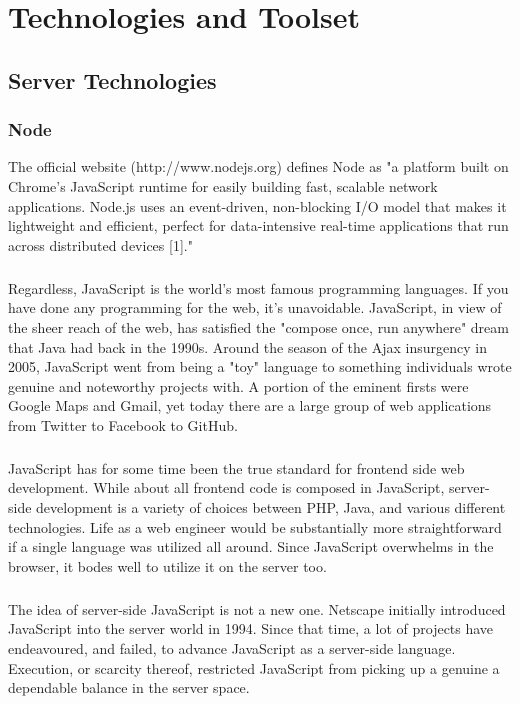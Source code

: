 \documentclass[../thesis.tex]{subfiles}
\begin{document}
\chapter{Technologies and Toolset}

\section{Server Technologies}
\subsection{Node}
The official website (http://www.nodejs.org) defines Node as "a platform built on Chrome's JavaScript runtime for easily building fast, scalable network applications. Node.js uses an event-driven, non-blocking I/O model that makes it lightweight and efficient, perfect for data-intensive real-time applications that run across distributed devices [1]."
\paragraph{}
Regardless, JavaScript is the world's most famous programming languages. If you have done any programming for the web, it's unavoidable. JavaScript, in view of the sheer reach of the web, has satisfied the "compose once, run anywhere" dream that Java had back in the 1990s.  
Around the season of the Ajax insurgency in 2005, JavaScript went from being a "toy" language to something individuals wrote genuine and noteworthy projects with. A portion of the eminent firsts were Google Maps and Gmail, yet today there are a large group of web applications from Twitter to Facebook to GitHub.
\paragraph{}

JavaScript has for some time been the true standard for frontend side web development. While about all frontend code is composed in JavaScript, server-side development is a variety of choices between PHP, Java, and various different technologies. Life as a web engineer would be substantially more straightforward if a single language was utilized all around. Since JavaScript overwhelms in the browser, it bodes well to utilize it on the server too. 
\paragraph{}

The idea of server-side JavaScript is not a new one. Netscape initially introduced JavaScript into the server world in 1994. Since that time, a lot of projects have endeavoured, and failed, to advance JavaScript as a server-side language. Execution, or scarcity thereof, restricted JavaScript from picking up a genuine a dependable balance in the server space. 
\end{document}
